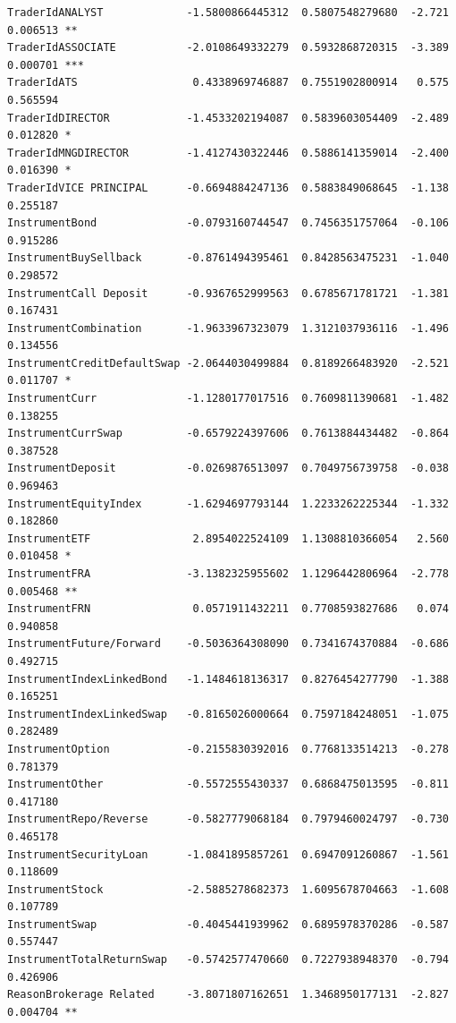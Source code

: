 \documentclass[a4paper]{article}
\begin{document}
\begin{verbatim}
TraderIdANALYST             -1.5800866445312  0.5807548279680  -2.721        0.006513 ** 
TraderIdASSOCIATE           -2.0108649332279  0.5932868720315  -3.389        0.000701 ***
TraderIdATS                  0.4338969746887  0.7551902800914   0.575        0.565594    
TraderIdDIRECTOR            -1.4533202194087  0.5839603054409  -2.489        0.012820 *  
TraderIdMNGDIRECTOR         -1.4127430322446  0.5886141359014  -2.400        0.016390 *  
TraderIdVICE PRINCIPAL      -0.6694884247136  0.5883849068645  -1.138        0.255187    
InstrumentBond              -0.0793160744547  0.7456351757064  -0.106        0.915286    
InstrumentBuySellback       -0.8761494395461  0.8428563475231  -1.040        0.298572    
InstrumentCall Deposit      -0.9367652999563  0.6785671781721  -1.381        0.167431    
InstrumentCombination       -1.9633967323079  1.3121037936116  -1.496        0.134556    
InstrumentCreditDefaultSwap -2.0644030499884  0.8189266483920  -2.521        0.011707 *  
InstrumentCurr              -1.1280177017516  0.7609811390681  -1.482        0.138255    
InstrumentCurrSwap          -0.6579224397606  0.7613884434482  -0.864        0.387528    
InstrumentDeposit           -0.0269876513097  0.7049756739758  -0.038        0.969463    
InstrumentEquityIndex       -1.6294697793144  1.2233262225344  -1.332        0.182860    
InstrumentETF                2.8954022524109  1.1308810366054   2.560        0.010458 *  
InstrumentFRA               -3.1382325955602  1.1296442806964  -2.778        0.005468 ** 
InstrumentFRN                0.0571911432211  0.7708593827686   0.074        0.940858    
InstrumentFuture/Forward    -0.5036364308090  0.7341674370884  -0.686        0.492715    
InstrumentIndexLinkedBond   -1.1484618136317  0.8276454277790  -1.388        0.165251    
InstrumentIndexLinkedSwap   -0.8165026000664  0.7597184248051  -1.075        0.282489    
InstrumentOption            -0.2155830392016  0.7768133514213  -0.278        0.781379    
InstrumentOther             -0.5572555430337  0.6868475013595  -0.811        0.417180    
InstrumentRepo/Reverse      -0.5827779068184  0.7979460024797  -0.730        0.465178    
InstrumentSecurityLoan      -1.0841895857261  0.6947091260867  -1.561        0.118609    
InstrumentStock             -2.5885278682373  1.6095678704663  -1.608        0.107789    
InstrumentSwap              -0.4045441939962  0.6895978370286  -0.587        0.557447    
InstrumentTotalReturnSwap   -0.5742577470660  0.7227938948370  -0.794        0.426906    
ReasonBrokerage Related     -3.8071807162651  1.3468950177131  -2.827        0.004704 ** 

\end{verbatim}
\end{document}
